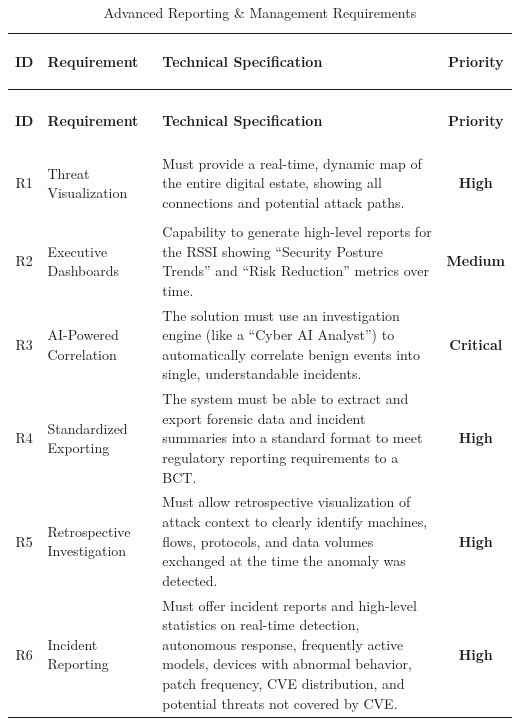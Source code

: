 \documentclass[12pt,a4paper]{report}
\newcommand{\critical}{\textbf{Critical}}
\newcommand{\high}{\textbf{High}}
\newcommand{\medium}{\textbf{Medium}}
\begin{document}
\begin{xltabular}{\textwidth}{c >{\bfseries\raggedright\arraybackslash}p{3.2cm} >{\raggedright\arraybackslash}X c}
    
    \caption{Advanced Reporting \& Management Requirements}
    \label{tab:reporting} \\
    \toprule
    \textbf{ID} & \textbf{Requirement} & \textbf{Technical Specification} & \textbf{Priority} \\
    \midrule
    \endfirsthead
    
     \\
    \toprule
    \textbf{ID} & \textbf{Requirement} & \textbf{Technical Specification} & \textbf{Priority} \\
    \midrule
    \endhead
    
   
    
    \bottomrule
    \endlastfoot
    
    R1 & Threat Visualization &
    Must provide a real-time, dynamic map of the entire digital estate, showing all connections and potential attack paths. & \high \\
    
    R2 & Executive Dashboards &
    Capability to generate high-level reports for the RSSI showing ``Security Posture Trends'' and ``Risk Reduction'' metrics over time. & \medium \\
    
    R3 & AI-Powered Correlation &
    The solution must use an investigation engine (like a ``Cyber AI Analyst'') to automatically correlate benign events into single, understandable incidents. & \critical \\
    
    R4 & Standardized Exporting &
    The system must be able to extract and export forensic data and incident summaries into a standard format to meet regulatory reporting requirements to a BCT. & \high \\
    
    R5 & Retrospective Investigation &
    Must allow retrospective visualization of attack context to clearly identify machines, flows, protocols, and data volumes exchanged at the time the anomaly was detected. & \high \\
    
    R6 & Incident Reporting &
    Must offer incident reports and high-level statistics on real-time detection, autonomous response, frequently active models, devices with abnormal behavior, patch frequency, CVE distribution, and potential threats not covered by CVE. & \high \\
    

\end{xltabular}
\end{document}
